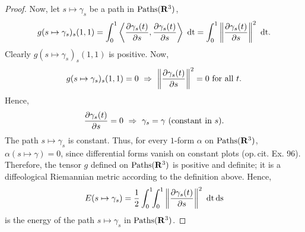 \begin{proof}
  Now,
  let $s \mapsto \gamma_s$ be a path in $\operatorname{Paths}(\mathbf{R}^3)$,
  \begin{equation*}
    g(s \mapsto \gamma_s)_s(1,1)   = \int_0^1 \left\langle {\partial \gamma_s(t) \over \partial s}, {\partial \gamma_s(t) \over \partial s} \right \rangle \ \mathrm{dt}
    = \int_0^1 \left\Vert{{\partial \gamma_s(t) \over \partial s}}\right\Vert^2 \ \mathrm{dt}.
  \end{equation*}
  Clearly $g(s \mapsto \gamma_s)_s(1,1)$ is positive.
  Now,
  $$
    g(s \mapsto \gamma_s)_s(1,1) = 0 \ \Rightarrow\ \left\Vert{{\partial \gamma_s(t) \over \partial s}}\right\Vert^2 = 0 \text{ for all } t.
    $$
  Hence,
  $$
    {\partial \gamma_s(t) \over \partial s} = 0 \ \Rightarrow\ \gamma_s = \gamma \text{ (constant in $s$)}.
    $$
  The path $s \mapsto \gamma_s$ is constant.
  Thus,
  for every $1$-form $\alpha$ on $\operatorname{Paths}(\mathbf{R}^3)$,
  $\alpha(s \mapsto \gamma) = 0$,
  since differential forms vanish on constant plots (op.\,cit. Ex. 96).
  Therefore,
  the tensor $g$ defined on $\operatorname{Paths}(\mathbf{R}^3)$ is positive and definite;
  it is a diffeological Riemannian metric according to the definition above.
  Hence,
  $$
    E(s \mapsto \gamma_s) = {1 \over 2} \int_0^1 \!\! \int_0^1 \left\Vert{{\partial \gamma_s(t) \over \partial s}}\right\Vert^2 \ \mathrm{dt} \,\mathrm{ds}
    $$
  is the energy of the path $s \mapsto \gamma_s$ in $\operatorname{Paths}(\mathbf{R}^3)$.
\end{proof}
